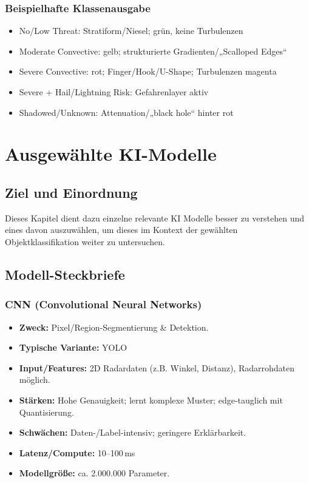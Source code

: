\subsection{Beispielhafte Klassenausgabe}
\begin{itemize}
  \item No/Low Threat: Stratiform/Niesel; grün, keine Turbulenzen 
  \item Moderate Convective: gelb; strukturierte Gradienten/„Scalloped Edges“ 
  \item Severe Convective: rot; Finger/Hook/U-Shape; Turbulenzen magenta 
  \item Severe + Hail/Lightning Risk: Gefahrenlayer aktiv 
  \item Shadowed/Unknown: Attenuation/„black hole“ hinter rot 
\end{itemize}


\chapter{Ausgewählte KI-Modelle}\label{chap:modelle}

\section{Ziel und Einordnung}\label{sec:modelle-intro}
Dieses Kapitel dient dazu einzelne relevante KI Modelle besser zu verstehen und eines davon 
auszuwählen, um dieses im Kontext der gewählten Objektklassifikation weiter zu untersuchen.


\section{Modell-Steckbriefe}

\subsection*{CNN (Convolutional Neural Networks)}
\begin{itemize}
  \item \textbf{Zweck:} Pixel/Region-Segmentierung \& Detektion.
  \item \textbf{Typische Variante:} YOLO
  \item \textbf{Input/Features:} 2D Radardaten (z.B. Winkel, Distanz), Radarrohdaten möglich.
  \item \textbf{Stärken:} Hohe Genauigkeit; lernt komplexe Muster; edge-tauglich mit  Quantisierung.
  \item \textbf{Schwächen:} Daten-/Label-intensiv; geringere Erklärbarkeit.
  \item \textbf{Latenz/Compute:} 10--100\,ms
  \item \textbf{Modellgröße:} ca. 2.000.000 Parameter.
\end{itemize}

